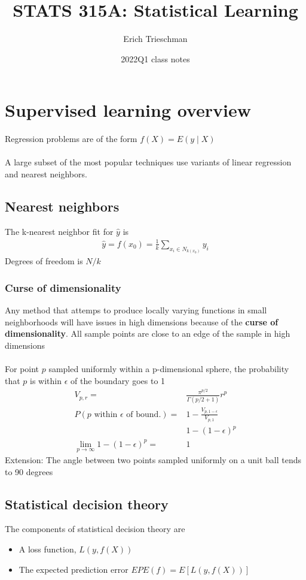 \documentclass{article}
\title{STATS 315A: Statistical Learning}
\author{Erich Trieschman}
\date{2022Q1 class notes}
\begin{document}
\maketitle

\tableofcontents

\section{Supervised learning overview}
Regression problems are of the form $f(X) = E(y \mid X)$\\\\
A large subset of the most popular techniques use variants of linear regression and nearest neighbors. 

\subsection{Nearest neighbors}
The k-nearest neighbor fit for $\hat{y}$ is 
\begin{align*}
  \hat{y} = f(x_0) = \frac{1}{k}\sum_{x_i \in N_{k(x_0)}}y_i
\end{align*}
Degrees of freedom is $N/k$
\subsubsection{Curse of dimensionality}
Any method that attemps to produce locally varying functions in small neighborhoods will have issues in high dimensions because of the \textbf{curse of dimensionality}. All sample points are close to an edge of the sample in high dimensions\\\\
For point $p$ sampled uniformly within a p-dimensional sphere, the probability that $p$ is within $\epsilon$ of the boundary goes to 1
\begin{align*}
  V_{p,r} =& \frac{\pi^{p/2}}{\Gamma(p/2 + 1)}r^p\\
  P(p \textrm{ within } \epsilon \textrm{ of bound.}) =& 1 - \frac{V_{p, 1-\epsilon}}{V_{p, 1}}\\
  & 1 - (1-\epsilon)^p\\
  \lim_{p\rightarrow \infty} 1 - (1 - \epsilon)^p =& 1
\end{align*}
Extension: The angle between two points sampled uniformly on a unit ball tends to 90 degrees


\subsection{Statistical decision theory}
The components of statistical decision theory are
\begin{itemize}
  \item A loss function, $L(y, f(X))$
  \item The expected prediction error $EPE(f) = E[L(y, f(X))]$
\end{itemize}
\end{document}
